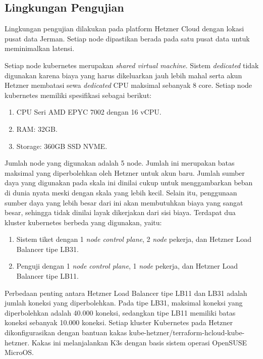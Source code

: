 \subsection{Lingkungan Pengujian}

Lingkungan pengujian dilakukan pada platform Hetzner Cloud dengan lokasi pusat data Jerman. Setiap node dipastikan berada pada satu pusat data untuk meminimalkan latensi.

Setiap node kubernetes merupakan \textit{shared virtual machine}. Sistem \textit{dedicated} tidak digunakan karena biaya yang harus dikeluarkan jauh lebih mahal serta akun Hetzner membatasi sewa \textit{dedicated} CPU maksimal sebanyak 8 core. Setiap node kubernetes memiliki spesifikasi sebagai berikut:

\begin{enumerate}
    \item CPU Seri AMD EPYC 7002 dengan 16 vCPU.
    \item RAM: 32GB.
    \item Storage: 360GB SSD NVME.
\end{enumerate}

Jumlah node yang digunakan adalah 5 node. Jumlah ini merupakan batas maksimal yang diperbolehkan oleh Hetzner untuk akun baru. Jumlah sumber daya yang digunakan pada skala ini dinilai cukup untuk menggambarkan beban di dunia nyata meski dengan skala yang lebih kecil. Selain itu, penggunaan sumber daya yang lebih besar dari ini akan membutuhkan biaya yang sangat besar, sehingga tidak dinilai layak dikerjakan dari sisi biaya. Terdapat dua kluster kubernetes berbeda yang digunakan, yaitu:

\begin{enumerate}
    \item Sistem tiket dengan 1 \textit{node control plane}, 2 \textit{node} pekerja, dan Hetzner Load Balancer tipe LB31.
    \item Penguji dengan 1 \textit{node control plane}, 1 \textit{node} pekerja, dan Hetzner Load Balancer tipe LB11.
\end{enumerate}

Perbedaan penting antara Hetzner Load Balancer tipe LB11 dan LB31 adalah jumlah koneksi yang diperbolehkan. Pada tipe LB31, maksimal koneksi yang diperbolehkan adalah 40.000 koneksi, sedangkan tipe LB11 memiliki batas koneksi sebanyak 10.000 koneksi. Setiap kluster Kubernetes pada Hetzner dikonfigurasikan dengan bantuan kakas kube-hetzner/terraform-hcloud-kube-hetzner. Kakas ini melanjalankan K3s dengan basis sistem operasi OpenSUSE MicroOS.
